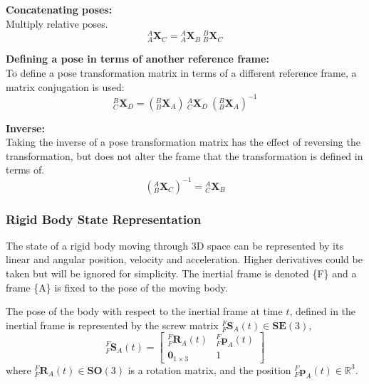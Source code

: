 		\textbf{Concatenating poses:}\\
		Multiply relative poses.
		\begin{equation}
			{^{A}_{A}\mathbf{X}^{}_{C}} = {^{A}_{A}\mathbf{X}^{}_{B}}\:{^{B}_{B}\mathbf{X}^{}_{C}}
		\end{equation}
		
		\textbf{Defining a pose in terms of another reference frame:}\\
		To define a pose transformation matrix in terms of a different reference frame, a matrix conjugation is used:
		\begin{equation}
			{^{B}_{C}\mathbf{X}^{}_{D}} = ({^{B}_{B}\mathbf{X}^{}_{A}})\:{^{A}_{C}\mathbf{X}^{}_{D}}\:({^{B}_{B}\mathbf{X}^{}_{A}})^{-1}
		\end{equation}

		\textbf{Inverse:}\\
		Taking the inverse of a pose transformation matrix has the effect of reversing the transformation, but does not alter the frame that the transformation is defined in terms of.
		\begin{equation}
			({^{A}_{B}\mathbf{X}^{}_{C}})^{-1} = {^{A}_{C}\mathbf{X}^{}_{B}}
		\end{equation}
	
	\subsubsection{Rigid Body State Representation} \label{state rep}
		The state of a rigid body moving through 3D space can be represented by its linear and angular position, velocity and acceleration. Higher derivatives could be taken but will be ignored for simplicity.
		The inertial frame is denoted \{F\} and a frame \{A\} is fixed to the pose of the moving body.
		
		The pose of the body with respect to the inertial frame at time $t$, defined in the inertial frame is represented by the screw matrix ${^{F}_{F}\mathbf{S}^{}_{A}(t)} \in \mathbf{SE}(3)$,
		\begin{equation}
				{^{F}_{F}\mathbf{S}^{}_{A}(t)} = 
				\begin{bmatrix}
						  ^{F}_{F}\mathbf{R}^{}_{A}(t) 	& 	^{F}_{F}\mathbf{p}^{}_{A}(t)\\
						  \textbf{0}_{1 \times 3} & 1						  
				\end{bmatrix}
		\end{equation}
		where $^{F}_{F}\mathbf{R}^{}_{A}(t) \in \mathbf{SO}(3)$ is a rotation matrix, and the position $^{F}_{F}\mathbf{p}^{}_{A}(t) \in \mathbb{R}^3$.
		
